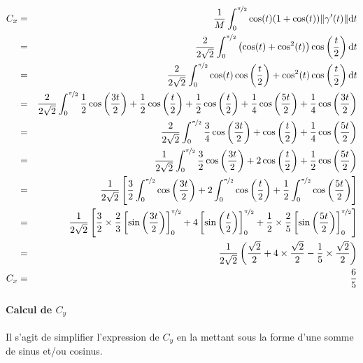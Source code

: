 \documentclass[a4paper, 11pt]{report} %
\newcommand{\dt}{\mathrm{d}t}
\begin{document}
\begin{eqnarray*}
C_x & = & \frac{1}{M}\int_0^{\nicefrac{\pi}{2}}\cos(t)(1+\cos(t))\lVert\gamma'(t)\rVert\dt\\
    & = & \frac{2}{2\sqrt{2}}\int_0^{\nicefrac{\pi}{2}}\left(\cos(t)+\cos^2(t)\right)\cos\left(\frac{t}{2}\right)\dt\\
    & = & \frac{2}{2\sqrt{2}}\int_0^{\nicefrac{\pi}{2}}\cos(t)\cos\left(\frac{t}{2}\right)+\cos^2(t)\cos\left(\frac{t}{2}\right)\dt\\
    & = & \frac{2}{2\sqrt{2}}\int_0^{\nicefrac{\pi}{2}}
        \frac{1}{2}\cos\left(\frac{3t}{2}\right)+\frac{1}{2}\cos\left(\frac{t}{2}\right)+
        \frac{1}{2}\cos\left(\frac{t}{2}\right) + \frac{1}{4}\cos\left(\frac{5t}{2}\right)+\frac{1}{4}\cos\left(\frac{3t}{2}\right)\\
    & = & \frac{2}{2\sqrt{2}}\int_0^{\nicefrac{\pi}{2}}
        \frac{3}{4}\cos\left(\frac{3t}{2}\right)+\cos\left(\frac{t}{2}\right)+ \frac{1}{4}\cos\left(\frac{5t}{2}\right)\\
    & = & \frac{1}{2\sqrt{2}}\int_0^{\nicefrac{\pi}{2}}
        \frac{3}{2}\cos\left(\frac{3t}{2}\right)+2\cos\left(\frac{t}{2}\right)+ \frac{1}{2}\cos\left(\frac{5t}{2}\right)\\
    & = & \frac{1}{2\sqrt{2}}\left[
            \frac{3}{2}\int_0^{\nicefrac{\pi}{2}}\cos\left(\frac{3t}{2}\right)+
            2\int_0^{\nicefrac{\pi}{2}}\cos\left(\frac{t}{2}\right)+
            \frac{1}{2}\int_0^{\nicefrac{\pi}{2}}\cos\left(\frac{5t}{2}\right)
        \right]\\
    & = & \frac{1}{2\sqrt{2}}\left[
        \frac{3}{2}\times\frac{2}{3}\left[\sin\left(\frac{3t}{2}\right)\right]_0^{\nicefrac{\pi}{2}}+
        4\left[\sin\left(\frac{t}{2}\right)\right]_0^{\nicefrac{\pi}{2}}+
        \frac{1}{2}\times\frac{2}{5}\left[\sin\left(\frac{5t}{2}\right)\right]_0^{\nicefrac{\pi}{2}}
        \right]\\
    & = & \frac{1}{2\sqrt{2}}\left(
        \frac{\sqrt{2}}{2}+
        4\times\frac{\sqrt{2}}{2}-
        \frac{1}{5}\times\frac{\sqrt{2}}{2}
        \right)\\
C_x & = & \frac{6}{5}
\end{eqnarray*}


\paragraph{Calcul de $C_y$} %

Il s'agit de simplifier l'expression de $C_y$ en la mettant sous la forme d'une somme de sinus et/ou cosinus.
\end{document}
